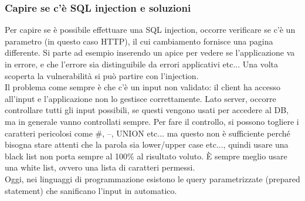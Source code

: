 \documentclass{article}
\begin{document}
\subsubsection{Capire se c'è SQL injection e soluzioni}
Per capire se è possibile effettuare una SQL injection, occorre verificare se c'è un parametro (in questo caso HTTP), il cui cambiamento fornisce una pagina differente. Si parte ad esempio inserendo un apice per vedere se l'applicazione va in errore, e che l'errore sia distinguibile da errori applicativi etc... Una volta scoperta la vulnerabilità si può partire con l'injection.\\ Il problema come sempre è che c'è un input non validato: il client ha accesso all'input e l'applicazione non lo gestisce correttamente. Lato server, occorre controllare tutti gli input possibili, se questi vengono usati per accedere al DB, ma in generale vanno controllati sempre. Per fare il controllo, si possono togliere i caratteri pericolosi come \#, --, UNION etc... ma questo non è sufficiente perché bisogna stare attenti che la parola sia lower/upper case etc..., quindi usare una black list non porta sempre al 100\% al risultato voluto. È sempre meglio usare una white list, ovvero una lista di caratteri permessi.\\ Oggi, nei linguaggi di programmazione esistono le query parametrizzate (prepared statement) che sanificano l'input in automatico.
\end{document}
